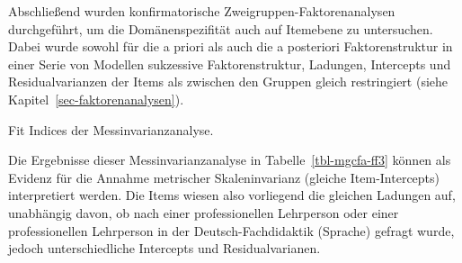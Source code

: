 \documentclass[
  letterpaper,
  DIV=11]{scrartcl}
\begin{document}
Abschließend wurden konfirmatorische Zweigruppen-Faktorenanalysen
durchgeführt, um die Domänenspezifität auch auf Itemebene zu
untersuchen. Dabei wurde sowohl für die a priori als auch die a
posteriori Faktorenstruktur in einer Serie von Modellen sukzessive
Faktorenstruktur, Ladungen, Intercepts und Residualvarianzen der Items
als zwischen den Gruppen gleich restringiert (siehe
Kapitel~\ref{sec-faktorenanalysen}).

\begin{table}

\caption{\label{tbl-mgcfa-ff3}Fit Indices der Messinvarianzanalyse.}


\end{table}%

Die Ergebnisse dieser Messinvarianzanalyse in
Tabelle~\ref{tbl-mgcfa-ff3} können als Evidenz für die Annahme
metrischer Skaleninvarianz (gleiche Item-Intercepts) interpretiert
werden. Die Items wiesen also vorliegend die gleichen Ladungen auf,
unabhängig davon, ob nach einer professionellen Lehrperson oder einer
professionellen Lehrperson in der Deutsch-Fachdidaktik (Sprache) gefragt
wurde, jedoch unterschiedliche Intercepts und Residualvarianen.
\end{document}
